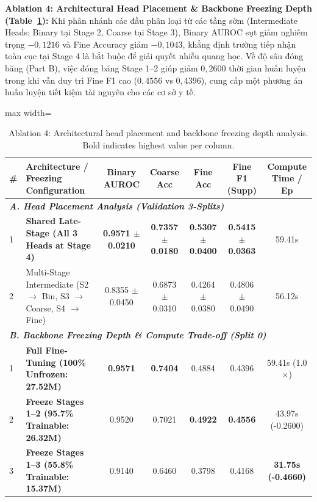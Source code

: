 \documentclass[runningheads]{llncs}
\begin{document}
\noindent \textbf{Ablation 4: Architectural Head Placement \& Backbone Freezing Depth (Table~\ref{tab:ablation_placement_freezing}):} 
Khi phân nhánh các đầu phân loại từ các tầng sớm (Intermediate Heads: Binary tại Stage 2, Coarse tại Stage 3), Binary AUROC sụt giảm nghiêm trọng $-0{,}1216$ và Fine Accuracy giảm $-0{,}1043$, khẳng định trường tiếp nhận toàn cục tại Stage 4 là bắt buộc để giải quyết nhiễu quang học. Về độ sâu đóng băng (Part B), việc đóng băng Stage 1--2 giúp giảm $0{,}2600$ thời gian huấn luyện trong khi vẫn duy trì Fine F1 cao ($0{,}4556$ vs $0{,}4396$), cung cấp một phương án huấn luyện tiết kiệm tài nguyên cho các cơ sở y tế.

\begin{table}[t]
\centering
\caption{Ablation 4: Architectural head placement and backbone freezing depth analysis. Bold indicates highest value per column.}
\label{tab:ablation_placement_freezing}
\begin{adjustbox}{max width=\textwidth}
\begin{tabular}{llccccc}
\toprule
\textbf{\#} & \textbf{Architecture / Freezing Configuration} & \textbf{Binary AUROC} & \textbf{Coarse Acc} & \textbf{Fine Acc} & \textbf{Fine F1 (Supp)} & \textbf{Compute Time / Ep} \\
\midrule
\multicolumn{7}{l}{\textit{\textbf{A. Head Placement Analysis (Validation 3-Splits)}}} \\
1 & \textbf{Shared Late-Stage (All 3 Heads at Stage 4)} & \textbf{0.9571 $\pm$ 0.0210} & \textbf{0.7357 $\pm$ 0.0180} & \textbf{0.5307 $\pm$ 0.0400} & \textbf{0.5415 $\pm$ 0.0363} & 59.41s \\
2 & Multi-Stage Intermediate (S2 $\to$ Bin, S3 $\to$ Coarse, S4 $\to$ Fine) & 0.8355 $\pm$ 0.0450 & 0.6873 $\pm$ 0.0310 & 0.4264 $\pm$ 0.0380 & 0.4806 $\pm$ 0.0490 & 56.12s \\
\midrule
\multicolumn{7}{l}{\textit{\textbf{B. Backbone Freezing Depth \& Compute Trade-off (Split 0)}}} \\
1 & \textbf{Full Fine-Tuning (100\% Unfrozen: 27.52M)} & \textbf{0.9571} & \textbf{0.7404} & 0.4884 & 0.4396 & 59.41s (1.0$\times$) \\
2 & \textbf{Freeze Stages 1--2 (95.7\% Trainable: 26.32M)} & 0.9520 & 0.7021 & \textbf{0.4922} & \textbf{0.4556} & 43.97s (-0.2600) \\
3 & \textbf{Freeze Stages 1--3 (55.8\% Trainable: 15.37M)} & 0.9140 & 0.6460 & 0.3798 & 0.4168 & \textbf{31.75s (-0.4660)} \\
\bottomrule
\end{tabular}
\end{adjustbox}
\end{table}
\end{document}
